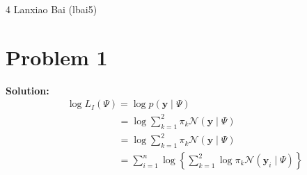 \documentclass[11pt]{article}
\begin{document}
\homework
    {4}
    {Lanxiao Bai (lbai5)}
    {}

\section*{Problem 1}
\textbf{Solution:} 
	\begin{align}
		&\log L_I(\Psi) = \log p(\mathbf{y} \mid \Psi)\nonumber\\
		&\phantom{\log L_1(\Psi)} = \log \sum_{k = 1}^2 \pi_k \mathcal{N}(\mathbf{y} \mid \Psi) \nonumber\\
		&\phantom{\log L_1(\Psi)} = \log \sum_{k = 1}^2 \pi_k \mathcal{N}(\mathbf{y} \mid \Psi) \nonumber\\
		&\phantom{\log L_1(\Psi)} = \sum_{i = 1}^n \log \left\{\sum_{k = 1}^2 \log \pi_k \mathcal{N}(\mathbf{y}_i \mid \Psi)\right\} \nonumber
	\end{align}
\end{document}
